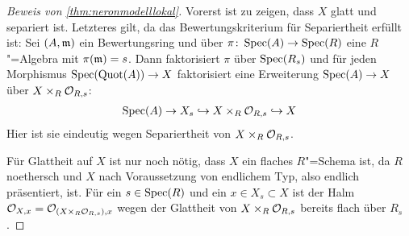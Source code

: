 
\begin{proof}[Beweis von \ref{thm:neronmodelllokal}]
  Vorerst ist zu zeigen, dass $X$ glatt und separiert ist.
  Letzteres gilt, da das Bewertungskriterium für Separiertheit
  erfüllt ist: Sei $(A,\mathfrak{m})$ ein Bewertungsring und über
  ${\pi\colon\operatorname{Spec}(A)\to\operatorname{Spec}(R)}$ eine $R$"=Algebra mit ${\pi(\mathfrak{m})=s}$.
  Dann faktorisiert $\pi$ über
  ${\operatorname{Spec}(R_s)}$ und für jeden Morphismus ${\operatorname{Spec}(\operatorname{Quot}(A))\to X}$
  faktorisiert eine Erweiterung ${\operatorname{Spec}(A)\to X}$ über
  ${X\times_R\mathcal{O}_{R,s}}$:
  \begin{gather*}
    \operatorname{Spec}(A)\to X_s\hookrightarrow X\times_R\mathcal{O}_{R,s}\hookrightarrow X
  \end{gather*}
  Hier ist sie eindeutig wegen Separiertheit von ${X\times_R\mathcal{O}_{R,s}}$.

  Für Glattheit auf $X$ ist nur noch nötig, dass $X$ ein flaches
  $R$"=Schema ist, da $R$ noethersch und $X$ nach Voraussetzung von
  endlichem Typ, also endlich präsentiert, ist.
  Für ein ${s\in\operatorname{Spec}(R)}$ und ein ${x\in X_s\subset X}$ ist der Halm
  ${\mathcal{O}_{X,x}=\mathcal{O}_{(X\times_R\mathcal{O}_{R,s}),x}}$ wegen der Glattheit von
  ${X\times_R\mathcal{O}_{R,s}}$ bereits flach über $R_s$.


\end{proof}
